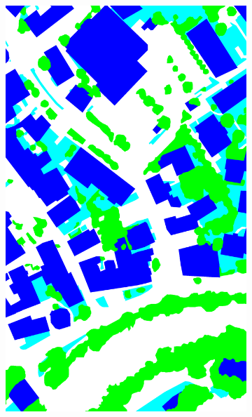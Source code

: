 \begin{figure}[htb]
\begin{subfigure}{0.19\textwidth}
  \includegraphics[width=1\linewidth]{fig/vai/26_gt.png}
\end{subfigure}


\end{figure}
